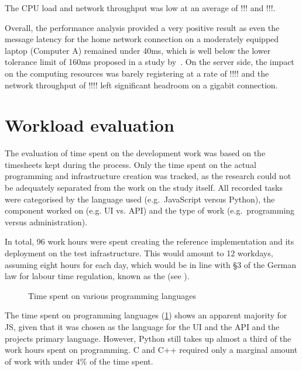 The \ac{CPU} load and network throughput was low at an average of !!! and !!!.

Overall, the performance analysis provided a very positive result as even the message latency for the home network connection on a moderately equipped laptop (Computer A) remained under 40ms, which is well below the lower tolerance limit of 160ms proposed in a study by~\cite{audioLatency}.
On the server side, the impact on the computing resources was barely registering at a rate of !!!! and the network throughput of !!!! left significant headroom on a gigabit connection.

\section{Workload evaluation}\label{sec:workload-evaluation}

The evaluation of time spent on the development work was based on the timesheets kept during the process.
Only the time spent on the actual programming and infrastructure creation was tracked, as the research could not be adequately separated from the work on the study itself.
All recorded tasks were categorised by the language used (e.g.\ JavaScript versus Python), the component worked on (e.g. \ac{UI} vs. \ac{API}) and the type of work (e.g.\ programming versus administration).

In total, 96 work hours were spent creating the reference implementation and its deployment on the test infrastructure.
This would amount to 12 workdays, assuming eight hours for each day, which would be in line with §3 of the German law for labour time regulation, known as the  (see \parencite{abzgPar3}).

\begin{figure}[h]
\centering

\caption[Time spent on languages]{Time spent on various programming languages\protect}
\label{fig:timeSpentLanguages}
\end{figure}

The time spent on programming languages (\ref{fig:timeSpentLanguages}) shows an apparent majority for \ac{JS}, given that it was chosen as the language for the \ac{UI} and the \ac{API} and the project\textquotesingle s primary language.
However, Python still takes up almost a third of the work hours spent on programming.
C and C++ required only a marginal amount of work with under 4\% of the time spent.

